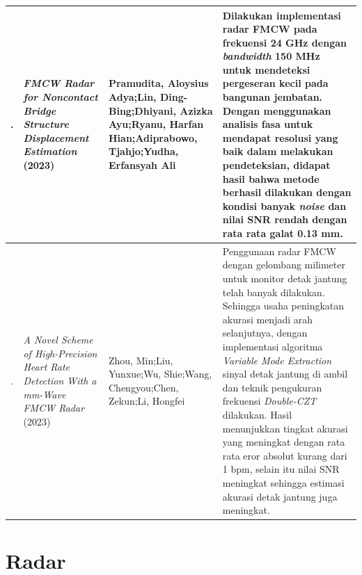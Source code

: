 \begin{center}
\begin{longtable}{|>{\centering\arraybackslash}p{0.6cm}|p{4cm}|p{4cm}|p{4cm}|}
	8. & \textit{FMCW Radar for Noncontact Bridge Structure Displacement Estimation} (2023)
	& Pramudita, Aloysius Adya;\newline Lin, Ding-Bing;\newline Dhiyani, Azizka Ayu;\newline Ryanu, Harfan Hian;\newline Adiprabowo, Tjahjo;\newline Yudha, Erfansyah Ali
	& Dilakukan implementasi radar FMCW pada frekuensi 24 GHz dengan \textit{bandwidth} 150 MHz untuk mendeteksi pergeseran kecil pada bangunan jembatan. Dengan menggunakan analisis fasa untuk mendapat resolusi yang baik dalam melakukan pendeteksian, didapat hasil bahwa metode berhasil dilakukan dengan kondisi banyak \textit{noise} dan nilai SNR rendah dengan rata rata galat 0.13 mm.\\ \hline
	
	9. & \textit{A Novel Scheme of High-Precision Heart Rate Detection With a mm-Wave FMCW Radar} (2023)
	& Zhou, Min;\newline Liu, Yunxue;\newline Wu, Shie;\newline Wang, Chengyou;\newline Chen, Zekun;\newline Li, Hongfei
	& Penggunaan radar FMCW dengan gelombang milimeter untuk monitor detak jantung telah banyak dilakukan. Sehingga usaha peningkatan akurasi menjadi arah selanjutnya, dengan implementasi algoritma \textit{Variable Mode Extraction} sinyal detak jantung di ambil dan teknik pengukuran frekuensi \textit{Double-CZT} dilakukan. Hasil menunjukkan tingkat akurasi yang meningkat dengan rata rata eror absolut kurang dari 1 bpm, selain itu nilai SNR meningkat sehingga estimasi akurasi detak jantung juga meningkat.\\ \hline
	\end{longtable}
\end{center}

\section{Radar}

